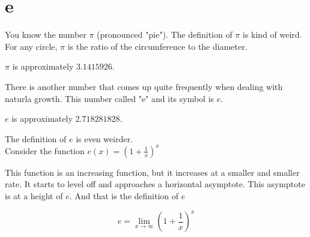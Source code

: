 \documentclass{ximera}
\begin{document}
\section{e}


You know the number $\pi$ (pronounced "pie").  The definition of $\pi$ is kind of weird.  For any circle, $\pi$ is the ratio of the circumference to the diameter.

$\pi$ is approximately $3.1415926$.





There is another number that comes up quite frequently when dealing with naturla growth.  This number called "e" and its symbol is $e$.

$e$ is approximately $2.718281828$.

The definition of $e$ is even weirder. \\


Consider the function $e(x) = \left(1 + \frac{1}{x}\right)^x$



\begin{center}
\end{center}


This function is an increasing function, but it increases at a smaller and smaller rate.  It starts to level off and approaches a horizontal asymptote.  This asymptote is at a height of $e$.  And that is the definition of $e$


\[   e = \lim_{x \to \infty}  \left(1 + \frac{1}{x}\right)^x      \]
\end{document}
